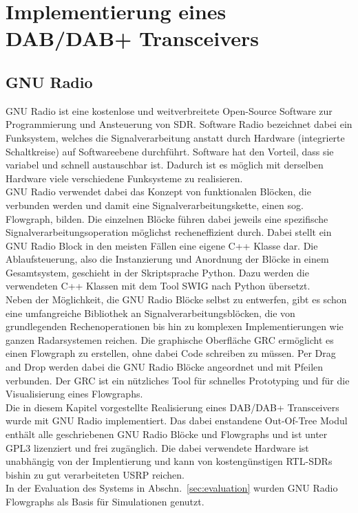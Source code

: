 \chapter{Implementierung eines DAB/DAB+ Transceivers}
\section{GNU Radio}
GNU Radio ist eine kostenlose und weitverbreitete Open-Source Software zur Programmierung und Ansteuerung von \ac{SDR}. Software Radio bezeichnet dabei ein Funksystem, welches die Signalverarbeitung anstatt durch Hardware (integrierte Schaltkreise) auf Softwareebene durchführt. Software hat den Vorteil, dass sie variabel und schnell austauschbar ist. Dadurch ist es möglich mit derselben Hardware viele verschiedene Funksysteme zu realisieren.\\
GNU Radio verwendet dabei das Konzept von funktionalen Blöcken, die verbunden werden und damit eine Signalverarbeitungskette, einen sog. Flowgraph, bilden. Die einzelnen Blöcke führen dabei jeweils eine spezifische Signalverarbeitungsoperation möglichst recheneffizient durch. Dabei stellt ein GNU Radio Block in den meisten Fällen eine eigene C++ Klasse dar. Die Ablaufsteuerung, also die Instanzierung und Anordnung der Blöcke in einem Gesamtsystem, geschieht in der Skriptsprache Python. Dazu werden die verwendeten C++ Klassen mit dem Tool \ac{SWIG} nach Python übersetzt.\\
Neben der Möglichkeit, die GNU Radio Blöcke selbst zu entwerfen, gibt es schon eine umfangreiche Bibliothek an Signalverarbeitungsblöcken, die von grundlegenden Rechenoperationen bis hin zu komplexen Implementierungen wie ganzen Radarsystemen reichen. Die graphische Oberfläche \ac{GRC} ermöglicht es einen Flowgraph zu erstellen, ohne dabei Code schreiben zu müssen. Per Drag and Drop werden dabei die GNU Radio Blöcke angeordnet und mit Pfeilen verbunden. Der GRC ist ein nützliches Tool für schnelles Prototyping und für die Visualisierung eines Flowgraphs.\\
Die in diesem Kapitel vorgestellte Realisierung eines DAB/DAB+ Transceivers wurde mit GNU Radio implementiert. Das dabei enstandene Out-Of-Tree Modul enthält alle geschriebenen GNU Radio Blöcke und Flowgraphs und ist unter \ac{GPL3} lizenziert und frei zugänglich. Die dabei verwendete Hardware ist unabhängig von der Implentierung und kann von kostengünstigen RTL-SDRs bishin zu gut verarbeiteten \ac{USRP} reichen.\\
In der Evaluation des Systems in Abschn.~\ref{sec:evaluation} wurden GNU Radio Flowgraphs als Basis für Simulationen genutzt.
